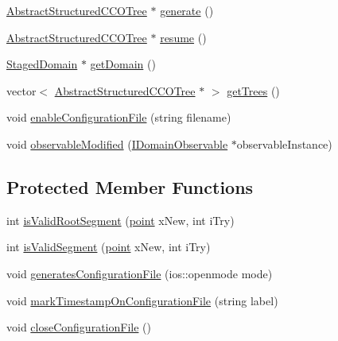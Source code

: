 \begin{DoxyCompactItemize}
\item 
\hyperlink{class_abstract_structured_c_c_o_tree}{Abstract\+Structured\+C\+C\+O\+Tree} $\ast$ \hyperlink{class_staged_f_r_r_s_tree_generator_a86dde9bdc838234e1e88a52fdfd4c6c2}{generate} ()
\item 
\hyperlink{class_abstract_structured_c_c_o_tree}{Abstract\+Structured\+C\+C\+O\+Tree} $\ast$ \hyperlink{class_staged_f_r_r_s_tree_generator_a8a61382d3442b29f63f8b1cf5f3e8092}{resume} ()
\item 
\hyperlink{class_staged_domain}{Staged\+Domain} $\ast$ \hyperlink{class_staged_f_r_r_s_tree_generator_a3cc900c34c4324210a3e732d674e5ff0}{get\+Domain} ()
\item 
vector$<$ \hyperlink{class_abstract_structured_c_c_o_tree}{Abstract\+Structured\+C\+C\+O\+Tree} $\ast$ $>$ \hyperlink{class_staged_f_r_r_s_tree_generator_ac1296de9b742a6a0de36be4d094afd70}{get\+Trees} ()
\item 
void \hyperlink{class_staged_f_r_r_s_tree_generator_ac78a1dadc8a9eb640520d03d415db12b}{enable\+Configuration\+File} (string filename)
\item 
void \hyperlink{class_staged_f_r_r_s_tree_generator_a6f7629b00510e27edddced056e6fa1a1}{observable\+Modified} (\hyperlink{class_i_domain_observable}{I\+Domain\+Observable} $\ast$observable\+Instance)
\end{DoxyCompactItemize}
\subsection*{Protected Member Functions}
\begin{DoxyCompactItemize}
\item 
int \hyperlink{class_staged_f_r_r_s_tree_generator_aab108e277110635297d2d8cd95c4cd1d}{is\+Valid\+Root\+Segment} (\hyperlink{structpoint}{point} x\+New, int i\+Try)
\item 
int \hyperlink{class_staged_f_r_r_s_tree_generator_ac78cabfc8a80b398c4daa0d86a38f872}{is\+Valid\+Segment} (\hyperlink{structpoint}{point} x\+New, int i\+Try)
\item 
void \hyperlink{class_staged_f_r_r_s_tree_generator_aabba68aefd4f5786afa4460fdeb9519c}{generates\+Configuration\+File} (ios\+::openmode mode)
\item 
void \hyperlink{class_staged_f_r_r_s_tree_generator_a303c648e7d6d5df8e55c8263865be7e5}{mark\+Timestamp\+On\+Configuration\+File} (string label)
\item 
void \hyperlink{class_staged_f_r_r_s_tree_generator_acfdaf03eea5350e0fd2f59a5a76f6b23}{close\+Configuration\+File} ()
\end{DoxyCompactItemize}
